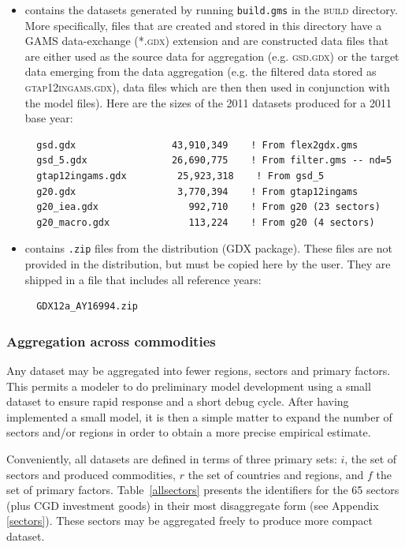 \begin{itemize}
\item[\textsc{gamsdata}] contains the datasets generated by running
\texttt{build.gms} in the \textsc{build} directory. More specifically,
files that are created and stored in this directory have a GAMS
data-exchange (\textsc{*.gdx}) extension and are constructed data
files that are either used as the source data for aggregation (e.g.
\textsc{gsd.gdx}) or the target data emerging from the data
aggregation (e.g. the filtered \GTAP data stored as
\textsc{gtap12ingams.gdx}), data files which are then then used in
conjunction with the model files). Here are the sizes of the 2011
datasets produced for a 2011 base year:
\begin{Verbatim}
  gsd.gdx                 43,910,349    ! From flex2gdx.gms
  gsd_5.gdx               26,690,775    ! From filter.gms -- nd=5
  gtap12ingams.gdx         25,923,318    ! From gsd_5
  g20.gdx                  3,770,394    ! From gtap12ingams
  g20_iea.gdx                992,710    ! From g20 (23 sectors)
  g20_macro.gdx              113,224    ! From g20 (4 sectors)
\end{Verbatim}

\item[\textsc{gtapdata}] contains \texttt{.zip} files from the \GTAP
distribution (GDX package). These files are not provided in the
\GTAPINGAMS distribution, but must be copied here by the user. They
are shipped in a file that includes all reference years:
\begin{Verbatim}
  GDX12a_AY16994.zip
\end{Verbatim}

\end{itemize}

\subsubsection{Aggregation across commodities}

Any \GTAPINGAMS dataset may be aggregated into fewer regions, sectors
and primary factors. This permits a modeler to do preliminary model
development using a small dataset to ensure rapid response and a short
debug cycle. After having implemented a small model, it is then a
simple matter to expand the number of sectors and/or regions in order
to obtain a more precise empirical estimate.

Conveniently, all \GTAP datasets are defined in terms of three primary
sets: $i$, the set of sectors and produced commodities, $r$ the set of
countries and regions, and $f$ the set of primary factors.
Table~\ref{allsectors} presents the identifiers for the 65 
sectors (plus CGD investment goods) in their most disaggregate form
(see Appendix \ref{sectors}). These sectors may be aggregated freely to produce
more compact dataset.


